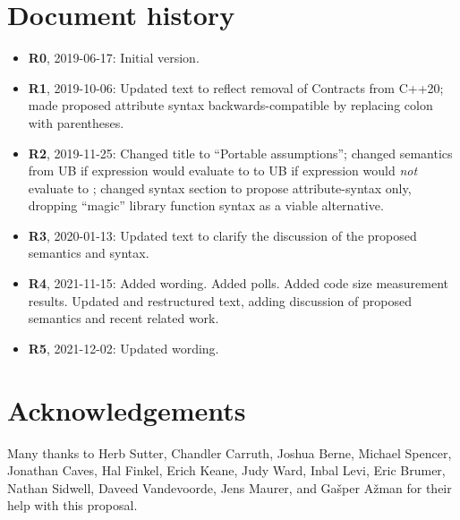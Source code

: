 \section*{Document history}

\begin{itemize}
\item \textbf{R0}, 2019-06-17: Initial version.
\item \textbf{R1}, 2019-10-06: Updated text to reflect removal of Contracts from C++20; made proposed attribute syntax backwards-compatible by replacing colon with parentheses.
\item \textbf{R2}, 2019-11-25: Changed title to ``Portable assumptions''; changed semantics from UB if expression would evaluate to  to UB if expression would \emph{not} evaluate to ; changed syntax section to propose attribute-syntax only, dropping ``magic'' library function syntax as a viable alternative.
\item \textbf {R3}, 2020-01-13: Updated text to clarify the discussion of the proposed semantics and syntax.
\item \textbf{R4}, 2021-11-15:  Added wording. Added polls. Added code size measurement results. Updated and restructured text, adding discussion of proposed semantics and recent related work.
\item \textbf{R5}, 2021-12-02: Updated wording.
\end{itemize}

\section*{Acknowledgements}

Many thanks to Herb Sutter, Chandler Carruth, Joshua Berne, Michael Spencer, Jonathan Caves, Hal Finkel, Erich Keane, Judy Ward, Inbal Levi, Eric Brumer, Nathan Sidwell, Daveed Vandevoorde, Jens Maurer, and Ga\v sper A\v zman for their help with this proposal.

\renewcommand{\bibname}{References}



